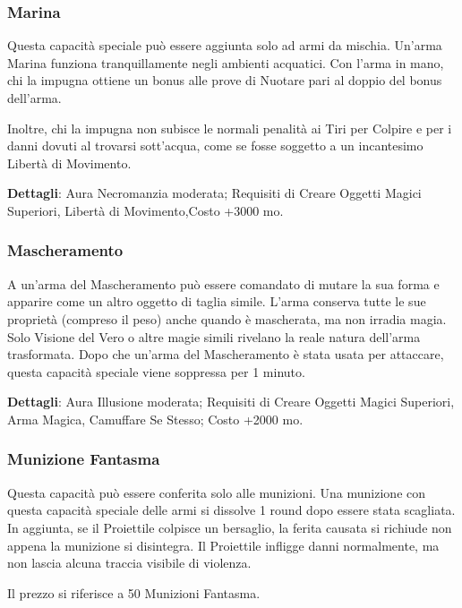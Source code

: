 \begin{multicols}{2}
\subsubsection*{Marina}

Questa capacità speciale può essere aggiunta solo ad armi da mischia. Un'arma Marina funziona tranquillamente negli ambienti acquatici. Con l'arma in mano, chi la impugna ottiene un bonus alle prove di Nuotare pari al doppio del bonus dell'arma.

Inoltre, chi la impugna non subisce le normali penalità ai Tiri per Colpire e per i danni dovuti al trovarsi sott'acqua, come se fosse soggetto a un incantesimo Libertà di Movimento.

\textbf{Dettagli}: Aura Necromanzia moderata; Requisiti di Creare Oggetti Magici Superiori, Libertà di Movimento,Costo +3000 mo.

\subsubsection*{Mascheramento}

A un'arma del Mascheramento può essere comandato di mutare la sua forma e apparire come un altro oggetto di taglia simile. L'arma conserva tutte le sue proprietà (compreso il peso) anche quando è mascherata, ma non irradia magia. Solo Visione del Vero o altre magie simili rivelano la reale natura dell'arma trasformata. Dopo che un'arma del Mascheramento è stata usata per attaccare, questa capacità speciale viene soppressa per 1 minuto.

\textbf{Dettagli}: Aura Illusione moderata; Requisiti di Creare Oggetti Magici Superiori, Arma Magica, Camuffare Se Stesso; Costo +2000 mo.

\subsubsection*{Munizione Fantasma}

Questa capacità può essere conferita solo alle munizioni. Una munizione con questa capacità speciale delle armi si dissolve 1 round dopo essere stata scagliata. In aggiunta, se il Proiettile colpisce un bersaglio, la ferita causata si richiude non appena la munizione si disintegra. Il Proiettile infligge danni normalmente, ma non lascia alcuna traccia visibile di violenza.

Il prezzo si riferisce a 50 Munizioni Fantasma.


\end{multicols}
